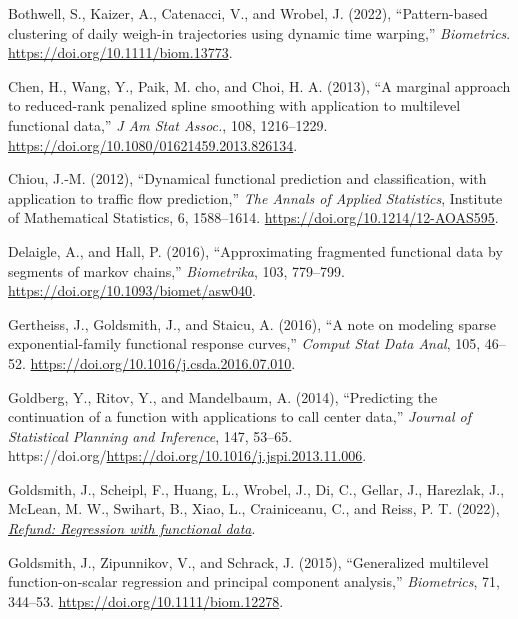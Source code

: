 \documentclass[
  11pt,
]{article}
\newlength{\cslhangindent}
\newlength{\cslentryspacingunit} %
\newenvironment{CSLReferences}[2] %
 {%
  \setlength{\parindent}{0pt}
  \ifodd #1
  \let\oldpar\par
  \def\par{\hangindent=\cslhangindent\oldpar}
  \fi
  \setlength{\parskip}{#2\cslentryspacingunit}
 }%
 {}
\begin{document}
\hypertarget{refs}{}
\begin{CSLReferences}{1}{0}
\leavevmode{}%
Bothwell, S., Kaizer, A., Catenacci, V., and Wrobel, J. (2022),
{``Pattern-based clustering of daily weigh-in trajectories using dynamic
time warping,''} \emph{Biometrics}.
\url{https://doi.org/10.1111/biom.13773}.

\leavevmode{}%
Chen, H., Wang, Y., Paik, M. cho, and Choi, H. A. (2013), {``A marginal
approach to reduced-rank penalized spline smoothing with application to
multilevel functional data,''} \emph{J Am Stat Assoc.}, 108, 1216--1229.
\url{https://doi.org/10.1080/01621459.2013.826134}.

\leavevmode{}%
Chiou, J.-M. (2012), {``Dynamical functional prediction and
classification, with application to traffic flow prediction,''}
\emph{The Annals of Applied Statistics}, Institute of Mathematical
Statistics, 6, 1588--1614. \url{https://doi.org/10.1214/12-AOAS595}.

\leavevmode{}%
Delaigle, A., and Hall, P. (2016), {``Approximating fragmented
functional data by segments of markov chains,''} \emph{Biometrika}, 103,
779--799. \url{https://doi.org/10.1093/biomet/asw040}.

\leavevmode{}%
Gertheiss, J., Goldsmith, J., and Staicu, A. (2016), {``A note on
modeling sparse exponential-family functional response curves,''}
\emph{Comput Stat Data Anal}, 105, 46--52.
\url{https://doi.org/10.1016/j.csda.2016.07.010}.

\leavevmode{}%
Goldberg, Y., Ritov, Y., and Mandelbaum, A. (2014), {``Predicting the
continuation of a function with applications to call center data,''}
\emph{Journal of Statistical Planning and Inference}, 147, 53--65.
https://doi.org/\url{https://doi.org/10.1016/j.jspi.2013.11.006}.

\leavevmode{}%
Goldsmith, J., Scheipl, F., Huang, L., Wrobel, J., Di, C., Gellar, J.,
Harezlak, J., McLean, M. W., Swihart, B., Xiao, L., Crainiceanu, C., and
Reiss, P. T. (2022),
\emph{\href{https://CRAN.R-project.org/package=refund}{Refund:
Regression with functional data}}.

\leavevmode{}%
Goldsmith, J., Zipunnikov, V., and Schrack, J. (2015), {``Generalized
multilevel function-on-scalar regression and principal component
analysis,''} \emph{Biometrics}, 71, 344--53.
\url{https://doi.org/10.1111/biom.12278}.


\end{CSLReferences}
\end{document}
